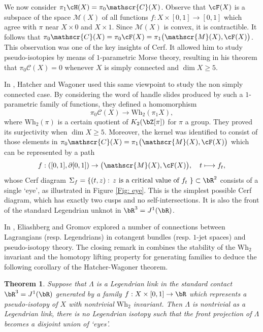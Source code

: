 \documentclass[JEP,XML,SOM,Unicode,NoFloatCountersInSection]{cedram}
\let\mathcal\mathscr
\newcommand\mto{\mathchoice{\longmapsto}{\mapsto}{\mapsto}{\mapsto}}
\newcommand{\Wh}{\mathrm{Wh}}
\theoremstyle{plain}
\newtheorem{theorem}{Theorem}[section]
\theoremstyle{definition}
\newcommand{\cC}{\mathcal{C}}\newcommand{\cD}{\mathcal{D}}
\newcommand{\cM}{\mathcal{M}}\newcommand{\cN}{\mathcal{N}}
\begin{document}
We now consider $\pi_1\cH(X) = \pi_0 \cC(X)$. Observe that $\cF(X)$ is a subspace of the space $\cM(X)$ of all functions $f:X \times [0,1] \to [0,1]$ which agree with $\pi$ near $X \times 0$ and $X \times 1$. Since $\cM(X)$ is convex, it is contractible. It follows that $\pi_0 \cC(X) = \pi_0 \cF(X) = \pi_1 \big( \cM(X), \cF(X) \big)$. This observation was one of the key insights of Cerf. It allowed him to study pseudo-isotopies by means of $1$-parametric Morse theory, resulting in his theorem \cite{C70} that $\pi_0 \cC(X) =0$ whenever $X$ is simply connected and $\dim X \geq 5$.

In \cite{HW73}, Hatcher and Wagoner used this same viewpoint to study the non simply connected case. By considering the word of handle slides produced by such a $1$-parametric family of functions, they defined a homomorphism
\[ \pi_0 \cC(X) \to \Wh_2(\pi_1X ), \]
where $\Wh_2(\pi)$ is a certain quotient of $K_2( \bZ[\pi])$ for $\pi$ a group. They proved its surjectivity when $\dim X \geq 5$. Moreover, the kernel was identified to consist of those elements in $\pi_0 \cC(X) = \pi_1 \big( \cM(X), \cF(X) \big)$ which can be represented by a path
\[ f: ([0,1],\partial [0,1]) \to \big(\cM(X), \cF(X)\big), \quad t \mto f_t,\]
whose Cerf diagram $\Sigma_f = \{ (t,z) : \, \text{$z$ is a critical value of $f_t$ } \} \subset \bR^2$ consists of a single `eye', as illustrated in Figure \ref{Fig: eye}. This is the simplest possible Cerf diagram, which has exactly two cusps and no self-intersections. It is also the front of the standard Legendrian unknot in $\bR^3=J^1(\bR)$.

In \cite{EG98}, Eliashberg and Gromov explored a number of connections between Lagrangians (resp. Legendrians) in cotangent bundles (resp. $1$-jet spaces) and pseudo-isotopy theory. The closing remark in \cite{EG98} combines the stability of the $\Wh_2$ invariant and the homotopy lifting property for generating families to deduce the following corollary of the Hatcher-Wagoner theorem.

\begin{theorem}\label{Theorem: wh1} Suppose that $\Lambda$ is a Legendrian link in the standard contact $\bR^3=J^1(\bR)$ generated by a family $f:X \times [0,1] \to \bR$ which represents a pseudo-isotopy of $X$ with nontrivial $\Wh_2$ invariant. Then $\Lambda$ is nontrivial as a Legendrian link, \ie there is no Legendrian isotopy such that the front projection of $\Lambda$ becomes a disjoint union of `eyes'. \end{theorem}
\end{document}
